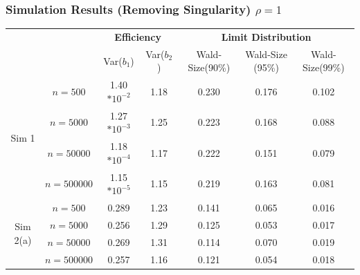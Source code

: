 \documentclass{beamer}
\begin{document}
\begin{frame}
\frametitle{Simulation Results (Removing Singularity) $\rho=1$}
 \begin{table}[H]
\begin{center}
\tiny

\begin{tabular}{|cc|cc|ccc|}

\hline
& & \multicolumn{2}{c|}{\textbf{Efficiency}} & \multicolumn{3}{c|}{\textbf{Limit Distribution }}  \\

& & \multicolumn{1}{c}{Var($b_1$)}& \multicolumn{1}{c|}{Var($b_2$)}
  & \multicolumn{1}{c}{Wald-Size(90\%)}
                & \multicolumn{1}{c}{Wald-Size (95\%)}      & \multicolumn{1}{c|}{Wald-Size(99\%)}
\\ \hline

  \multirow{4}{*}{\begin{sideways}\parbox{2cm}{\centering Sim 1}\end{sideways}}



&\hspace{-0.7cm}$ n=500$   & 1.40$*10^{-2}$&1.18  &0.230 &   0.176   & 0.102      \\  [0.18cm]
&\hspace{-0.7cm}$n=5000$   & 1.27$*10^{-3}$&1.25  &0.223 &   0.168   & 0.088     \\ [0.18cm]
&\hspace{-0.5cm}$n=50000$  & 1.18$*10^{-4}$&1.17  &0.222 &   0.151   & 0.079      \\  [0.18cm]
&\hspace{-0.30cm}$n=500000$& 1.15$*10^{-5}$&1.15  &0.219 &   0.163   & 0.081       \\ [0.18cm]


  \hline








  \multirow{4}{*}{\begin{sideways}\parbox{2cm}{\centering Sim 2(a) }\end{sideways}}

&\hspace{-0.7cm}$ n=500$      &0.289 &1.23  &0.141  & 0.065    &0.016    \\  [0.18cm]
&\hspace{-0.7cm}$n=5000$      &0.256 &1.29  &0.125  & 0.053    &0.017   \\ [0.18cm]
&\hspace{-0.5cm}$n=50000$     &0.269 &1.31  &0.114  & 0.070    & 0.019   \\  [0.18cm]
&\hspace{-0.30cm}$n=500000$   &0.257 &1.16  &0.121  & 0.054    & 0.018    \\ [0.18cm]




\end{tabular}
\end{center}
\end{table}
\end{frame}
\end{document}
